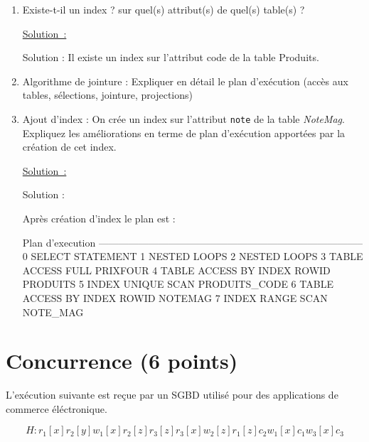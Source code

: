 \documentclass[french]{article}
\newenvironment{smallverbatim}%
{\endgraf\small\verbatimtab}{\endverbatimtab}
\newenvironment{solution}{\nopagebreak\par\vspace*{2mm}\underline{Solution~:}\em\par}{\par\vspace*{2mm}}
\begin{document}
\begin{enumerate}
 \item Existe-t-il un index ? sur quel(s) attribut(s) de quel(s) table(s) ?
\begin{solution}
      Solution : Il existe un index sur l'attribut code de la table Produits.
\end{solution}
  \item Algorithme de jointure : Expliquer en détail le plan d'exécution (accès
  aux tables, sélections, jointure, projections) 

  \item Ajout d'index : On crée un
  index sur l'attribut \texttt{note} de la table 
     \textit{NoteMag}. Expliquez les améliorations en
  terme de plan d'exécution apportées par la création de cet index.
\begin{solution}
Solution :

Après création d'index le plan est :

\begin{smallverbatim}
Plan d'execution
--------------------------------------------------------------------------------
0 SELECT STATEMENT
  1 NESTED LOOPS
    2 NESTED LOOPS
      3 TABLE ACCESS FULL PRIXFOUR
      4 TABLE ACCESS BY INDEX ROWID PRODUITS
        5 INDEX UNIQUE SCAN PRODUITS_CODE
    6 TABLE ACCESS BY INDEX ROWID NOTEMAG
      7 INDEX RANGE SCAN NOTE_MAG
\end{smallverbatim}
\end{solution}
\end{enumerate}



\section{Concurrence (6 points)}

L'exécution suivante est reçue par un SGBD utilisé pour des applications de commerce éléctronique.

$$H : r_1[x] r_2[y] w_1[x] r_2[z] r_3[z] r_3[x] w_2[z] r_1[z] c_2 w_1[x] c_1 w_3[x] c_3$$
\end{document}
